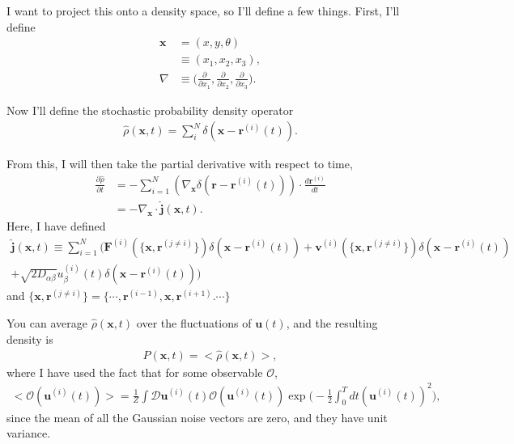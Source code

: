 \documentclass{article}
\begin{document}
I want to project this onto a density space, so I'll define a few things. First, I'll define
\begin{align}
    \bm{x}&=(x,y,\theta)\nonumber\\
    &\equiv(x_1,x_2,x_3),\label{eq:def_x}\\
    \nabla&\equiv\bigg(\frac{\partial}{\partial x_1},\frac{\partial}{\partial x_2},\frac{\partial}{\partial x_3}\bigg).
\end{align}

Now I'll define the stochastic probability density operator
\begin{align}
    \hat{\rho}(\bm{x},t)=\sum_{i}^N\delta(\bm{x}-\bm{r}^{(i)}(t)).
\end{align}

From this, I will then take the partial derivative with respect to time,
\begin{align}\label{eq:start}
    \frac{\partial \hat{\rho}}{\partial t} &= -\sum_{i=1}^N(\nabla_{\bm{x}}\delta(\bm{r}-\bm{r}^{(i)}(t)))\cdot\frac{d\bm{r}^{(i)}}{dt}\nonumber\\
    &=-\nabla_{\bm{x}}\cdot\hat{\bm{j}}(\bm{x},t).
\end{align}
Here, I have defined
\begin{align}
    \hat{\bm{j}}(\bm{x},t)\equiv\sum_{i=1}^N\bigg(\bm{F}^{(i)}(\{\bm{x},\bm{r}^{(j\neq i)}\})\delta(\bm{x}-\bm{r}^{(i)}(t))+\bm{v}^{(i)}(\{\bm{x},\bm{r}^{(j\neq i)}\})\delta(\bm{x}-\bm{r}^{(i)}(t))\nonumber\\
    +\sqrt{2D_{\alpha\beta}}u_{\beta}^{(i)}(t)\delta(\bm{x}-\bm{r}^{(i)}(t))\bigg)
\end{align}
and $\{\bm{x},\bm{r}^{(j\neq i)}\}= \{\cdots,\bm{r}^{(i-1)},\bm{x},\bm{r}^{(i+1)}.\cdots\}$

You can average $\hat{\rho}(\bm{x},t)$ over the fluctuations of $\bm{u}(t)$, and the resulting density is
\begin{align}
    P(\bm{x},t)=<\hat{\rho}(\bm{x},t)>,
\end{align}
where I have used the fact that for some observable $\mathcal{O}$,
\begin{align}
    <\mathcal{O}(\bm{u}^{(i)}(t))>=\frac{1}{Z}\int\mathcal{D}\bm{u}^{(i)}(t)\mathcal{O}(\bm{u}^{(i)}(t))\exp\bigg(-\frac{1}{2}\int_0^Tdt(\bm{u}^{(i)}(t))^2\bigg),
\end{align}
since the mean of all the Gaussian noise vectors are zero, and they have unit variance.
\end{document}

